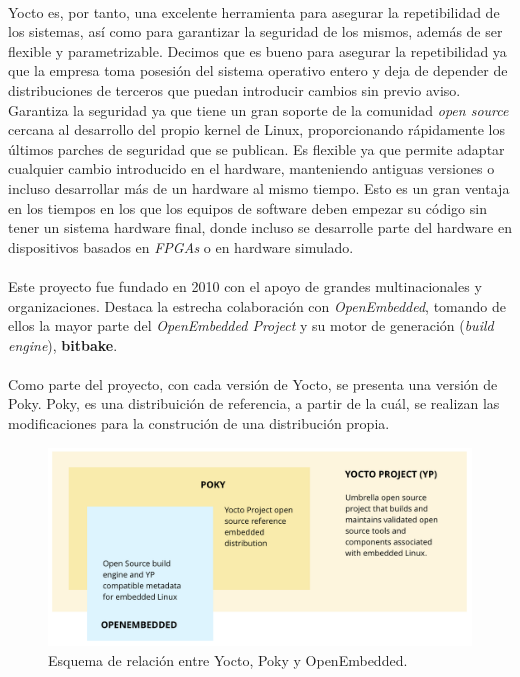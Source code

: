 \paragraph{} Yocto es, por tanto, una excelente herramienta para asegurar la repetibilidad
de los sistemas, así como para garantizar la seguridad de los mismos, además de ser
flexible y parametrizable. Decimos que es bueno para asegurar la repetibilidad
ya que la empresa toma posesión del sistema operativo entero y deja de depender de
distribuciones de terceros que puedan introducir cambios sin previo aviso. Garantiza la
seguridad ya que tiene un gran soporte de la comunidad \emph{\gls{open source}} cercana
al desarrollo del propio kernel de Linux, proporcionando rápidamente los últimos parches
de seguridad que se publican. Es flexible ya que permite adaptar cualquier cambio
introducido en el hardware, manteniendo antiguas versiones o incluso desarrollar más de
un hardware al mismo tiempo. Esto es un gran ventaja en los tiempos en los que los equipos
de software deben empezar su código sin tener un sistema hardware final, donde incluso
se desarrolle parte del hardware en dispositivos basados en \emph{\gls{FPGAs}} o en
hardware simulado.

\paragraph{} Este proyecto fue fundado en 2010 con el apoyo de grandes multinacionales
y organizaciones. Destaca la estrecha colaboración con \emph{OpenEmbedded}, tomando de
ellos la mayor parte del \emph{OpenEmbedded Project} y su motor de generación (\emph{build
engine}), \textbf{bitbake}.

\paragraph{} Como parte del proyecto, con cada versión de Yocto, se presenta una versión
de Poky. Poky, es una distribuición de referencia, a partir de la cuál, se realizan las
modificaciones para la construción de una distribución propia.

\begin{figure}[h]
	\centering
	\includegraphics[width=0.60\linewidth]{figs/yocto-overview}
	\caption[Yocto Overview]{Esquema de relación entre Yocto, Poky y OpenEmbedded.}
	\label{fig:yocto_overview}
\end{figure}

